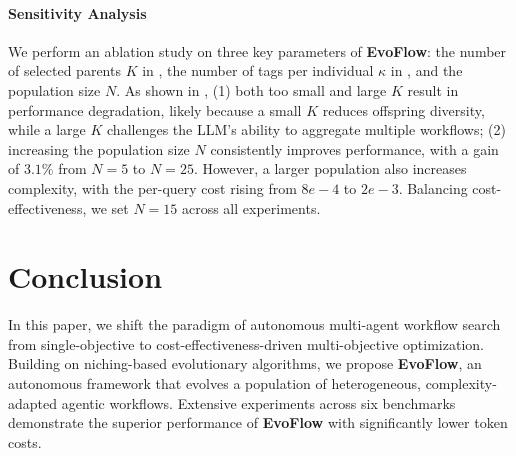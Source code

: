 \documentclass{article}
\theoremstyle{plain}
\theoremstyle{definition}
\theoremstyle{remark}
\newcommand{\ourmethod}{{\fontfamily{lmtt}\selectfont \textbf{EvoFlow}}\xspace}
\begin{document}
\vspace{-1em}
\paragraph{Sensitivity Analysis}
We perform an ablation study on three key parameters of \ourmethod: the number of selected parents $K$ in , the number of tags per individual $\kappa$ in , and the population size $N$. As shown in , (1) both too small and large $K$ result in performance degradation, likely because a small $K$ reduces offspring diversity, while a large $K$ challenges the LLM's ability to aggregate multiple workflows; (2) increasing the population size $N$ consistently improves performance, with a gain of $3.1\%$ from $N=5$ to $N=25$. However, a larger population also increases complexity, with the per-query cost rising from $8e-4$ to $2e-3$. Balancing cost-effectiveness, we set $N=15$ across all experiments.


\vspace{-0.5em}
\section{Conclusion}
\vspace{-0.7em}
In this paper, we shift the paradigm of autonomous multi-agent workflow search from single-objective to cost-effectiveness-driven multi-objective optimization. Building on niching-based evolutionary algorithms, we propose \ourmethod, an autonomous framework that evolves a population of heterogeneous, complexity-adapted agentic workflows. Extensive experiments across six benchmarks demonstrate the superior performance of \ourmethod with significantly lower token costs.
\end{document}
